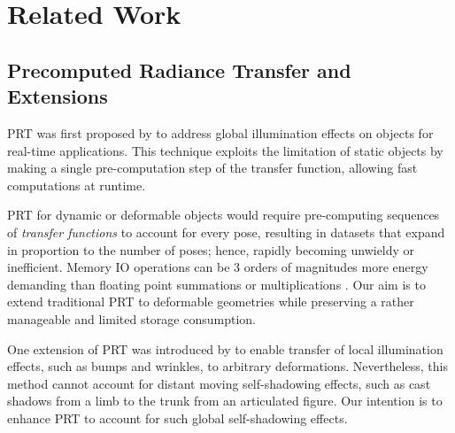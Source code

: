 \section{Related Work}
\subsection*{Precomputed Radiance Transfer and Extensions} 
PRT was first proposed by \cite{sloan2002precomputed} to address global illumination effects on objects for real-time applications. This technique exploits the limitation of static objects by making a single pre-computation step of the transfer function, allowing fast computations at runtime. 

PRT for dynamic or deformable objects would require pre-computing sequences of \textit{transfer functions} to account for every pose, resulting in datasets that expand in proportion to the number of poses; hence, rapidly becoming unwieldy or inefficient. Memory IO operations can be 3 orders of magnitudes more energy demanding than floating point summations or multiplications \cite{ComputingEnergy}. Our aim is to extend traditional PRT to deformable geometries while preserving a rather manageable and limited storage consumption.

One extension of PRT was introduced by  \cite{local-deformable-precomputed-radiance-transfer} to enable transfer of local illumination effects, such as bumps and wrinkles, to arbitrary deformations.  Nevertheless, this method cannot account for distant moving self-shadowing effects, such as cast shadows from a limb to the trunk from an articulated figure. Our intention is to enhance PRT to account for such global self-shadowing effects.

